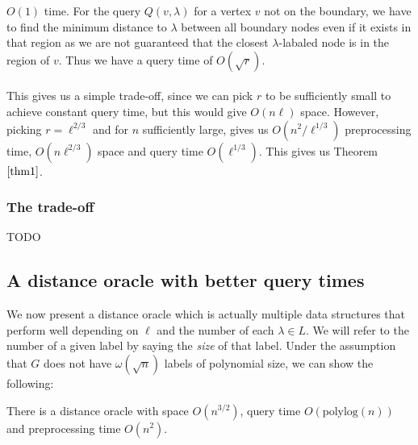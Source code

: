 $O(1)$ time. For the query $Q(v,\lambda)$ for a vertex $v$ not on the boundary, we have
to find the minimum distance to $\lambda$ between all boundary nodes even if it exists in
that region as we are not guaranteed that the closest $\lambda$-labaled node is in the
region of $v$. Thus we have a query time of $O(\sqrt{r})$. \\
\\
This gives us a simple trade-off, since we can pick $r$ to be sufficiently small to
achieve constant query time, but this would give $O(n\ell)$ space. However, picking
$r=\ell^{2/3}$ and for $n$ sufficiently large, gives us $O(n^2/\ell^{1/3})$ preprocessing time, $O(n\ell^{2/3})$ space and query time $O(\ell^{1/3})$. This gives us Theorem $\ref{thm1}$.

\subsubsection{The trade-off}
TODO

\subsection{A distance oracle with better query times}\label{oracle2}
We now present a distance oracle which is actually multiple data structures that perform
well depending on $\ell$ and the number of each $\lambda\in L$. We will refer to the
number of a given label by saying the \textit{size} of that label. Under the assumption
that $G$ does not have $\omega(\sqrt{n})$ labels of polynomial size, we can show the
following:
\begin{thm}\label{thm2}
  There is a distance oracle with space $O(n^{3/2})$, query time $O(\text{polylog}(n))$ and
  preprocessing time $O(n^2)$.
\end{thm}

